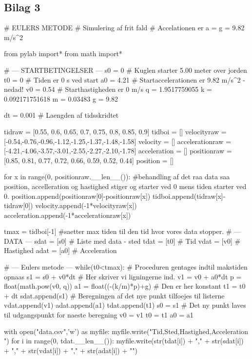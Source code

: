 \documentclass[12pt]{article}
\begin{document}
\subsection*{Bilag 3}
\begin{python}
# EULERS METODE
# Simulering af frit fald
# Accelationen er a = g = 9.82 m/s^2

from pylab import*
from math import*

# --- STARTBETINGELSER ---
s0 = 0         # Kuglen starter 5.00 meter over jorden
t0 = 0         # Tiden er 0 s ved start
a0 = 4.21      # Startaccelerationen er 9.82 m/s^2 - nedad!
v0 = 0.54          # Starthastigheden er 0 m/s
q = 1.9517759055
k = 0.092171751618
m = 0.03483
g = 9.82

dt = 0.001      # Laengden af tidsskridtet

tidraw = [0.55, 0.6, 0.65, 0.7, 0.75, 0.8, 0.85, 0.9]
tidboi = []
velocityraw =[-0.54,-0.76,-0.96,-1.12,-1.25,-1.37,-1.48,-1.58]
velocity = []
accelerationraw = [-4.21,-4.06,-3.57,-3.01,-2.55,-2.27,-2.10,-1.78]
acceleration = []
positionraw = [0.85, 0.81, 0.77, 0.72, 0.66, 0.59, 0.52, 0.44]
position = []

for x in range(0, positionraw.__len__()):  #behandling af det raa data saa position, accelleration og hastighed stiger og starter ved 0 mens tiden starter ved 0.
    position.append(positionraw[0]-positionraw[x])
    tidboi.append(tidraw[x]-tidraw[0])
    velocity.append(-1*velocityraw[x])
    acceleration.append(-1*accelerationraw[x])

tmax = tidboi[-1]   #saetter max tiden til den tid hvor vores data stopper.
# --- DATA ---
sdat = [s0]       # Liste med data - sted
tdat = [t0]       # Tid
vdat = [v0]       # Hastighed
adat = [a0]     # Acceleration

# --- Eulers metode ---
while(t0<tmax):     # Proceduren gentages indtil makstiden opnaas
    s1 = s0 + v0*dt # Her skriver vi ligningerne ind.
    v1 = v0 + a0*dt
    p = float(math.pow(v0, q))
    a1 = float((-(k/m)*p)+g)       # Den er her konstant
    t1 = t0 + dt
    sdat.append(s1) # Beregningen af det nye punkt tilfoejes til listerne
    vdat.append(v1)
    adat.append(a1)
    tdat.append(t1)
    s0 = s1         # Det ny punkt laves til udgangspunkt for naeste beregning
    v0 = v1
    t0 = t1
    a0 = a1

with open("data.csv",'w') as myfile:
    myfile.write("Tid,Sted,Hastighed,Acceleration \n")
    for i in range(0, tdat.__len__()):
        myfile.write(str(tdat[i]) + "," + str(sdat[i]) + "," + str(vdat[i]) + "," + str(adat[i]) + "\n")


\end{python}
\end{document}
